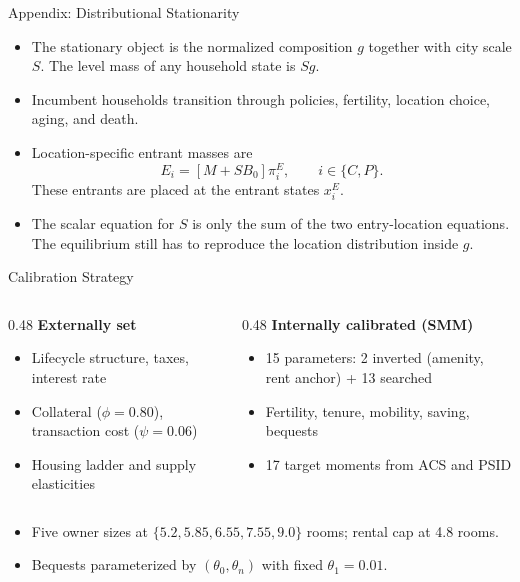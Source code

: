 \documentclass[11pt,aspectratio=169]{beamer}
\begin{document}
\begin{frame}[t]{Appendix: Distributional Stationarity}
\footnotesize
\setlength{\abovedisplayskip}{4pt}\setlength{\belowdisplayskip}{4pt}
\begin{itemize}\setlength\itemsep{6pt}
  \item The stationary object is the normalized composition $g$ together with
  city scale $S$. The level mass of any household state is $Sg$.

  \item Incumbent households transition through policies, fertility, location
  choice, aging, and death.

  \item Location-specific entrant masses are
  \[
  E_i=\left[M+S B_0\right]\pi_i^E,
  \qquad i\in\{C,P\}.
  \]
  These entrants are placed at the entrant states $x_i^E$.

  \item The scalar equation for $S$ is only the sum of the two entry-location
  equations. The equilibrium still has to reproduce the location distribution
  inside $g$.
\end{itemize}
\end{frame}

\begin{frame}{Calibration Strategy}
\label{app:calibration_strategy}
\footnotesize
\begin{columns}[T,onlytextwidth]
\begin{column}{0.48\textwidth}
\textbf{Externally set}
\begin{itemize}\setlength\itemsep{-1pt}
  \item Lifecycle structure, taxes, interest rate
  \item Collateral ($\phi=0.80$), transaction cost ($\psi=0.06$)
  \item Housing ladder and supply elasticities
\end{itemize}
\end{column}
\begin{column}{0.48\textwidth}
\textbf{Internally calibrated (SMM)}
\begin{itemize}\setlength\itemsep{-1pt}
  \item 15 parameters: 2 inverted (amenity, rent anchor) + 13 searched
  \item Fertility, tenure, mobility, saving, bequests
  \item 17 target moments from ACS and PSID
\end{itemize}
\end{column}
\end{columns}

\medskip
\begin{itemize}\setlength\itemsep{-1pt}
  \item Five owner sizes at $\{5.2, 5.85, 6.55, 7.55, 9.0\}$ rooms; rental cap at 4.8 rooms.
  \item Bequests parameterized by $(\theta_0,\theta_n)$ with fixed $\theta_1=0.01$.
\end{itemize}
\end{frame}
\end{document}
